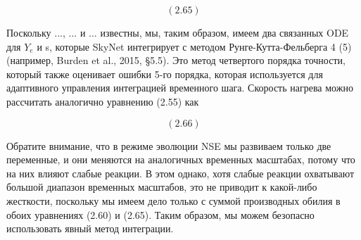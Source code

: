 \documentclass[%
bachelor,    %
natbib,      %
subf,        %
href,        %
colorlinks,  %
]{disser}
\begin{document}
$$(2.65)$$

Поскольку $...$, $...$ и $...$ известны, мы, таким образом, имеем два связанных ODE для $Y_e$ и s, которые SkyNet интегрирует с методом Рунге-Кутта-Фельберга 4 (5) (например, Burden et al., 2015, §5.5). Это метод четвертого порядка точности, который также оценивает ошибки 5-го порядка, которая используется для адаптивного управления интеграцией временного шага. Скорость нагрева можно рассчитать аналогично уравнению (2.55) как

$$(2.66)$$

Обратите внимание, что в режиме эволюции NSE мы развиваем только две переменные, и они меняются на аналогичных временных масштабах, потому что на них влияют слабые реакции. В этом однако, хотя слабые реакции охватывают большой диапазон временных масштабов, это не приводит к какой-либо жесткости, поскольку мы имеем дело только с суммой производных обилия в обоих уравнениях (2.60) и (2.65). Таким образом, мы можем безопасно использовать явный метод интеграции.
\end{document}
